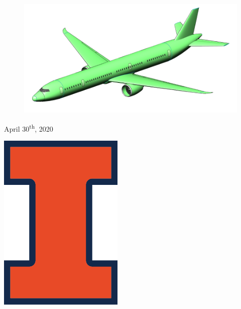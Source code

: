 \begin{titlepage}
	
        \begin{figure}[H]
            \centering
            \includegraphics[width=0.9\linewidth]{Photos/Detailed Isometric PDR.jpeg}
            \label{figISO}
        \end{figure}
	
	\vfill\vfill\vfill %
	
	{\large April 30\textsuperscript{th}, 2020} %
	
	
	\vfill\vfill
	\begin{minipage}{\linewidth}
		\begin{flushright}
	        \includegraphics[scale=0.5]{Photos/Illinois-Logo-Full-Color-RGB.png}\\[1cm]
		\end{flushright}
	\end{minipage}
	 
	
	\vfill %
	
\end{titlepage}





